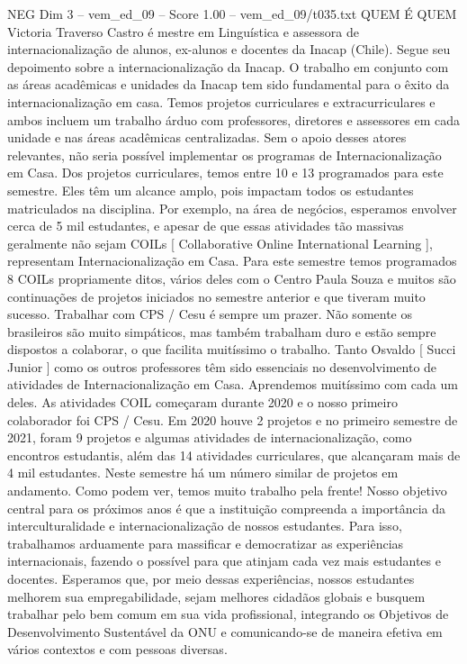 \begin{textsample}{NEG Dim 3 – vem\_ed\_09 – Score 1.00 – vem\_ed\_09/t035.txt}  \label{ex:f3_neg_030}
QUEM É QUEM Victoria Traverso Castro é mestre em Linguística e assessora de internacionalização de alunos, ex-alunos e docentes da Inacap (Chile).
Segue seu depoimento sobre a internacionalização da Inacap.
O trabalho em conjunto com as áreas acadêmicas e unidades da Inacap tem sido fundamental para o êxito da internacionalização em casa.
Temos projetos curriculares e extracurriculares e ambos incluem um trabalho árduo com professores, diretores e assessores em cada unidade e nas áreas acadêmicas centralizadas.
Sem o apoio desses atores relevantes, não seria possível implementar os programas de Internacionalização em Casa.
Dos projetos curriculares, temos entre 10 e 13 programados para este semestre.
Eles têm um alcance amplo, pois impactam todos os estudantes matriculados na disciplina.
Por exemplo, na área de negócios, esperamos envolver cerca de 5 mil estudantes, e apesar de que essas atividades tão massivas geralmente não sejam COILs [ Collaborative Online International Learning ], representam Internacionalização em Casa.
Para este semestre temos programados 8 COILs propriamente ditos, vários deles com o Centro Paula Souza e muitos são continuações de projetos iniciados no semestre anterior e que tiveram muito sucesso.
Trabalhar com CPS / Cesu é sempre um prazer.
Não somente os brasileiros são muito simpáticos, mas também trabalham duro e estão sempre dispostos a colaborar, o que facilita muitíssimo o trabalho.
Tanto Osvaldo [ Succi Junior ] como os outros professores têm sido essenciais no desenvolvimento de atividades de Internacionalização em Casa.
Aprendemos muitíssimo com cada um deles.
As atividades COIL começaram durante 2020 e o nosso primeiro colaborador foi CPS / Cesu.
Em 2020 houve 2 projetos e no primeiro semestre de 2021, foram 9 projetos e algumas atividades de internacionalização, como encontros estudantis, além das 14 atividades curriculares, que alcançaram mais de 4 mil estudantes.
Neste semestre há um número similar de projetos em andamento.
Como podem ver, temos muito trabalho pela frente!
Nosso objetivo central para os próximos anos é que a instituição compreenda a importância da interculturalidade e internacionalização de nossos estudantes.
Para isso, trabalhamos arduamente para massificar e democratizar as experiências internacionais, fazendo o possível para que atinjam cada vez mais estudantes e docentes.
Esperamos que, por meio dessas experiências, nossos estudantes melhorem sua empregabilidade, sejam melhores cidadãos globais e busquem trabalhar pelo bem comum em sua vida profissional, integrando os Objetivos de Desenvolvimento Sustentável da ONU e comunicando-se de maneira efetiva em vários contextos e com pessoas diversas.

\end{textsample}
